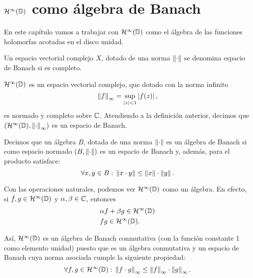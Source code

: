 \chapter{$\mathcal{H}^{\infty}(\mathbb{D})$ como álgebra de Banach}

En este capítulo vamos a trabajar con $\mathcal{H}^{\infty}(\mathbb{D})$ como el álgebra de las funciones holomorfas acotadas en el disco unidad. \\

\begin{definition}
    Un espacio vectorial complejo $X$, dotado de una norma $\left\lVert\cdot\right\rVert$ se denomina espacio de Banach si es completo.
\end{definition}

\medskip
$\mathcal{H}^{\infty}(\mathbb{D})$ es un espacio vectorial complejo, que dotado con la norma infinito
\begin{equation*}
    \left\lVert f\right\rVert_{\infty} = \sup_{\left\lvert z\right\rvert < 1} \left\lvert f(z)\right\rvert,
\end{equation*}
es normado y completo sobre $\mathbb{C}$. Atendiendo a la definición anterior, decimos que  $(\mathcal{H}^{\infty}(\mathbb{D}), \left\lVert\cdot\right\rVert_{\infty})$ es un espacio de Banach. \\

\begin{definition}
    Decimos que un álgebra $B$, dotada de una norma $\left\lVert\cdot\right\rVert$ es un álgebra de Banach si como espacio normado $(B, \left\lVert\cdot\right\rVert)$ es un espacio de Banach y, además, para el producto satisface:
    \begin{equation*}
        \forall x, y \in B: \, \left\lVert x \cdot y\right\rVert \leq \left\lVert x\right\rVert \cdot \left\lVert y\right\rVert.
    \end{equation*}
\end{definition}

\medskip
Con las operaciones naturales, podemos ver $\mathcal{H}^{\infty}(\mathbb{D})$ como un álgebra. En efecto, si $f, g \in \mathcal{H}^{\infty}(\mathbb{D})$ y $\alpha, \beta \in \mathbb{C}$, entonces
\begin{equation*}
    \begin{split}
        & \alpha f + \beta g \in \mathcal{H}^{\infty}(\mathbb{D}) \\
        & fg \in \mathcal{H}^{\infty}(\mathbb{D}).
    \end{split}
\end{equation*}

Así, $\mathcal{H}^{\infty}(\mathbb{D})$ es un álgebra de Banach conmutativa (con la función constante 1 como elemento unidad) puesto que es un álgebra conmutativa y un espacio de Banach cuya norma asociada cumple la siguiente propiedad:
\begin{equation*}
    \forall f, g \in \mathcal{H}^{\infty}(\mathbb{D}): \, \left\lVert f \cdot g\right\rVert_{\infty} \leq \left\lVert f\right\rVert_{\infty} \cdot \left\lVert g\right\rVert_{\infty}.
\end{equation*} \\

